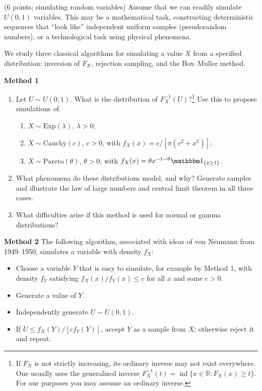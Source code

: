 \documentclass[a4paper]{report}
\begin{document}
\begin{problem} (6 points; simulating random variables)
Assume that we can readily simulate $U(0,1)$ variables. This may be a mathematical task, constructing deterministic sequences that ``look like'' independent uniform samples (pseudorandom numbers), or a technological task using physical phenomena.

We study three classical algorithms for simulating a value $X$ from a specified distribution: inversion of $F_X$, rejection sampling, and the Box--Muller method.

\textbf{Method 1}
\begin{enumerate}
\item Let $U\sim U(0,1)$. What is the distribution of $F_X^{-1}(U)$?\footnote{If $F_X$ is not strictly increasing, its ordinary inverse may not exist everywhere. One usually uses the generalized inverse $F_X^{-1}(t)=\inf\{x\in\mathbb R:F_X(x)\geq t\}$. For our purposes you may assume an ordinary inverse.} Use this to propose simulations of:
\begin{enumerate}
\item $X\sim\mathrm{Exp}(\lambda)$, $\lambda>0$;
\item $X\sim\mathrm{Cauchy}(c)$, $c>0$, with $f_X(x)=c/[\pi(c^2+x^2)]$;
\item $X\sim\mathrm{Pareto}(\theta)$, $\theta>0$, with $f_X(x)=\theta x^{-1-\theta}\mathbbm1_{\{x\geq1\}}$.
\end{enumerate}
\item What phenomena do these distributions model, and why? Generate samples and illustrate the law of large numbers and central limit theorem in all three cases.
\item What difficulties arise if this method is used for normal or gamma distributions?
\end{enumerate}
\textbf{Method 2}
The following algorithm, associated with ideas of von Neumann from 1949--1950, simulates a variable with density $f_X$:
\begin{itemize}
\item Choose a variable $Y$ that is easy to simulate, for example by Method 1, with density $f_Y$ satisfying $f_X(x)/f_Y(x)\leq c$ for all $x$ and some $c>0$.
\item Generate a value of $Y$.
\item Independently generate $U\sim U(0,1)$.
\item If $U\leq f_X(Y)/[cf_Y(Y)]$, accept $Y$ as a sample from $X$; otherwise reject it and repeat.
\end{itemize}

\end{problem}
\end{document}
